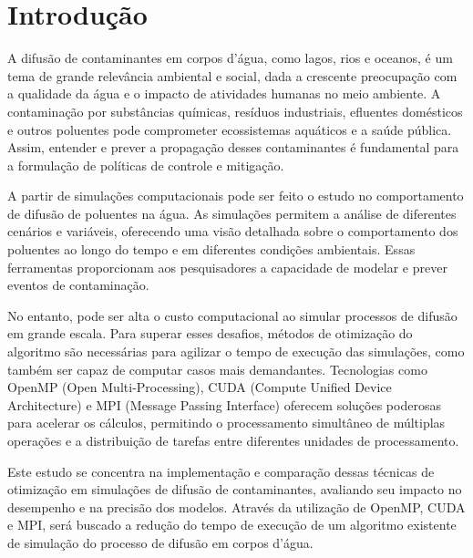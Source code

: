 \section{Introdução}

A difusão de contaminantes em corpos d'água, como lagos, rios e oceanos, é um tema de grande relevância ambiental e social, dada a crescente preocupação com a qualidade da água e o impacto de atividades humanas no meio ambiente. A contaminação por substâncias químicas, resíduos industriais, efluentes domésticos e outros poluentes pode comprometer ecossistemas aquáticos e a saúde pública. Assim, entender e prever a propagação desses contaminantes é fundamental para a formulação de políticas de controle e mitigação.

A partir de simulações computacionais pode ser feito o estudo no comportamento de difusão de poluentes na água. As simulações permitem a análise de diferentes cenários e variáveis, oferecendo uma visão detalhada sobre o comportamento dos poluentes ao longo do tempo e em diferentes condições ambientais. Essas ferramentas proporcionam aos pesquisadores a capacidade de modelar e prever eventos de contaminação.

No entanto, pode ser alta o custo computacional ao simular processos de difusão em grande escala. Para superar esses desafios, métodos de otimização do algoritmo são necessárias para agilizar o tempo de execução das simulações, como também ser capaz de computar casos mais demandantes. Tecnologias como OpenMP (Open Multi-Processing), CUDA (Compute Unified Device Architecture) e MPI (Message Passing Interface) oferecem soluções poderosas para acelerar os cálculos, permitindo o processamento simultâneo de múltiplas operações e a distribuição de tarefas entre diferentes unidades de processamento.

Este estudo se concentra na implementação e comparação dessas técnicas de otimização em simulações de difusão de contaminantes, avaliando seu impacto no desempenho e na precisão dos modelos. Através da utilização de OpenMP, CUDA e MPI, será buscado a redução do tempo de execução de um algoritmo existente de simulação do processo de difusão em corpos d'água.
